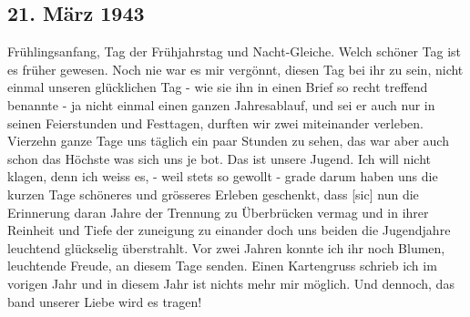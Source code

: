 \subsection{21. M\"{a}rz 1943}

Fr\"{u}hlingsanfang, Tag der Fr\"{u}hjahrstag und Nacht-Gleiche.
Welch sch\"{o}ner Tag ist es fr\"{u}her gewesen.
Noch nie war es mir verg\"{o}nnt, diesen Tag bei ihr zu sein, nicht einmal unseren gl\"{u}cklichen Tag - wie sie ihn in einen Brief so recht treffend benannte - ja nicht einmal einen ganzen Jahresablauf, und sei er auch nur in seinen Feierstunden und Festtagen, durften wir zwei miteinander verleben.
Vierzehn ganze Tage uns t\"{a}glich ein paar Stunden zu sehen, das war aber auch schon das H\"{o}chste was sich uns je bot.
Das ist unsere Jugend.
Ich will nicht klagen, denn ich weiss es, - weil stets so gewollt - grade darum haben uns die kurzen Tage sch\"{o}neres und gr\"{o}sseres Erleben geschenkt, dass{\color{red} [sic] } nun die Erinnerung daran Jahre der Trennung zu \"{U}berbr\"{u}cken vermag und in ihrer Reinheit und Tiefe der zuneigung zu einander doch uns beiden die Jugendjahre leuchtend gl\"{u}ckselig \"{u}berstrahlt.
Vor zwei Jahren konnte ich ihr noch Blumen, leuchtende Freude, an diesem Tage senden.
Einen Kartengruss schrieb ich im vorigen Jahr und in diesem Jahr ist nichts mehr mir m\"{o}glich.
Und dennoch, das band unserer Liebe wird es tragen!

\clearpage
